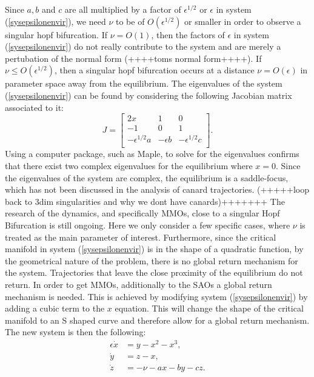 Since $a, b$ and $c$ are all multiplied by a factor of $\epsilon^{1/2}$ or $\epsilon$ in system (\ref{sysepsilonenvir}), we need $\nu$ to be of $O(\epsilon^{1/2})$ or smaller in order to observe a singular hopf bifurcation.
If $\nu=O(1)$, then the factors of $\epsilon$ in system (\ref{sysepsilonenvir}) do not really contribute to the system and are merely a pertubation of the normal form (++++toms normal form++++).
If $\nu \leq O(\epsilon^{1/2})$, then a singular hopf bifurcation occurs at a distance $\nu =O(\epsilon)$ in parameter space away from the equilibrium.
The eigenvalues of the system (\ref{sysepsilonenvir}) can be found by considering the following Jacobian matrix associated to it:
\begin{equation}
J=\begin{bmatrix}
2x & 1 & 0 \\
-1 & 0 & 1 \\
-\epsilon^{1/2} a & - \epsilon b & - \epsilon^{1/2} c\\
\end{bmatrix}.
\end{equation}
Using a computer package, such as Maple, to solve for the eigenvalues confirms that there exist two complex eigenvalues for the equilibrium where $x=0$.
Since the eigenvalues of the system are complex, the equilibrium is a saddle-focus, which has not been discussed in the analysis of canard trajectories. (+++++loop back to 3dim singularities and why we dont have canards)+++++++
The research of the dynamics, and specifically MMOs, close to a singular Hopf Bifurcation is still ongoing. Here we only consider a few specific cases, where $\nu$ is treated as the main parameter of interest. Furthermore, since the critical manifold in system (\ref{sysepsilonenvir}) is in the shape of a quadratic function, by the geometrical nature of the problem, there is no global return mechanism for the system. Trajectories that leave the close proximity of the equilibrium do not return. In order to get MMOs, additionally to the SAOs a global return mechanism is needed.
This is achieved by modifying system (\ref{sysepsilonenvir}) by adding a cubic term to the $x$ equation. This will change the shape of the critical manifold to an S shaped curve and therefore allow for a global return mechanism. The new system is then the following:
\begin{align*}
\epsilon \dot{x} &= y - x^2 - x^3, \\
\dot{y} &= z - x, \\
\dot{z} &= -\nu -ax -by -cz.
\end{align*}

